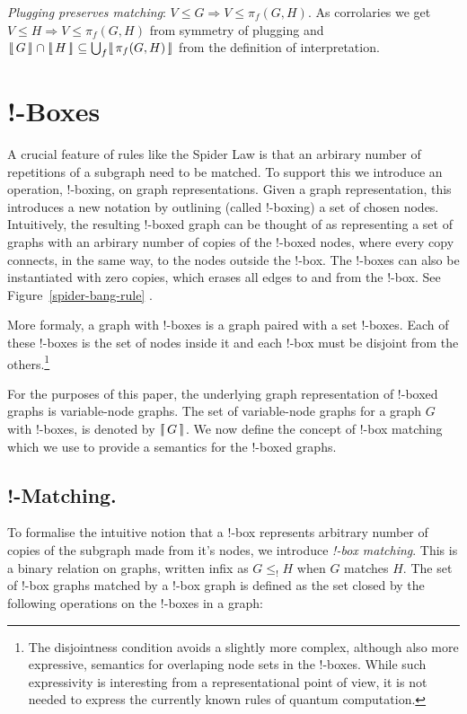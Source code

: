 \documentclass[runningheads]{llncs}
\newcommand{\vinterp}[1]{\lfloor\hspace{-0.27em}|\, #1\, |\hspace{-0.27em}\rfloor}
\newcommand{\binterp}[1]{\lceil\hspace{-0.27em}|\, #1\, |\hspace{-0.27em}\rceil}
\begin{document}
\begin{theorem}
  \emph{Plugging preserves matching}: $V \leq G \Rightarrow V \leq
  \pi_f(G,H)$. As corrolaries we get $V \leq H \Rightarrow V \leq
  \pi_f(G,H)$ from symmetry of plugging and $\vinterp{G} \cap
  \vinterp{H} \subseteq \bigcup_f \vinterp{\pi_f(G,H)}$ from the
  definition of interpretation. 
\end{theorem}



\section{!-Boxes}

A crucial feature of rules like the Spider Law is that an arbirary
number of repetitions of a subgraph need to be matched. To support
this we introduce an operation, !-boxing, on graph
representations. Given a graph representation, this introduces a new
notation by outlining (called !-boxing) a set of chosen
nodes. Intuitively, the resulting !-boxed graph can be thought of as
representing a set of graphs with an arbirary number of copies of the
!-boxed nodes, where every copy connects, in the same way, to the
nodes outside the !-box. The !-boxes can also be instantiated with
zero copies, which erases all edges to and from the !-box. See
Figure~\ref{spider-bang-rule} .

More formaly, a graph with !-boxes is a graph paired with a set
!-boxes. Each of these !-boxes is the set of nodes inside it and each
!-box must be disjoint from the others.\footnote{The disjointness
  condition avoids a slightly more complex, although also more
  expressive, semantics for overlaping node sets in the !-boxes. While
  such expressivity is interesting from a representational point of
  view, it is not needed to express the currently known rules of
  quantum computation.} 

For the purposes of this paper, the underlying graph representation of
!-boxed graphs is variable-node graphs. The set of variable-node
graphs for a graph $G$ with !-boxes, is denoted by $\binterp{G}$. We
now define the concept of !-box matching which we use to provide a
semantics for the !-boxed graphs.

\subsection{!-Matching.}

To formalise the intuitive notion that a !-box represents arbitrary
number of copies of the subgraph made from it's nodes, we introduce
\emph{!-box matching}. This is a binary relation on graphs, written
infix as $G \leq_! H$ when $G$ matches $H$. The set of !-box graphs
matched by a !-box graph is defined as the set closed by the following
operations on the !-boxes in a graph:
\end{document}
